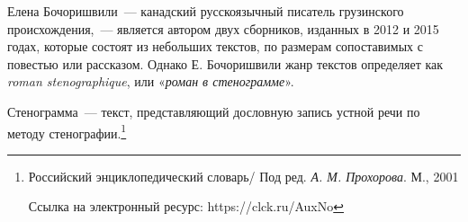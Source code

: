 \documentclass{kursa4}
\begin{document}


    Елена Бочоришвили~--- канадский русскоязычный писатель грузинского происхождения,~--- является автором двух сборников, изданных в 2012 и 2015 годах, которые состоят из небольших текстов, по размерам сопоставимых с повестью или рассказом. Однако Е. Бочоришвили жанр текстов определяет как \textit{roman stenographique}, или «\textit{роман в стенограмме}». 

    {Стенограмма~--- текст, представляющий дословную запись устной речи по методу стенографии.}\footnote{{Российский энциклопедический словарь/ Под ред. \textit{А. М. Прохорова}. М., 2001 }\par
    {Ссылка на электронный ресурс:
    https://clck.ru/AuxNo}}
\end{document}
